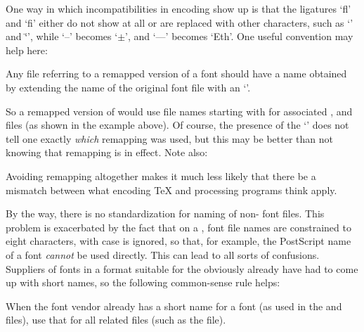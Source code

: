 One way in which incompatibilities in encoding show up is that the
ligatures `fl' and `fi' either do not show at all or are replaced with
other characters, such as `{\registered}' and `\={ }',  %
while `--' becomes `$\pm$', and `---' becomes `Eth'.
One useful convention may help here:

\beginbullets

\bpar Any file referring to a remapped version of a font should have a name
obtained by extending the name of the original font file with an `'.

\endbullets

\noindent
So a remapped version of  would use file names starting with
 for associated {\TFM}, {\PFB} and {\PFM} files
(as shown in the example above).
Of course, the presence of the `' does not tell one exactly 
{\it which\/} remapping was used, but this may be better than not knowing 
that remapping is in effect.
Note also:

\beginbullets

\bpar Avoiding remapping altogether makes it much less likely that there
be a mismatch between what encoding {\TeX} and 
{\DVI} processing programs think apply.

\endbullets
	
\noindent
By the way, there is no standardization for naming of non-{\CM} font files.
This problem is exacerbated %
by the fact that  on a {\PC}, font file names are constrained to eight
characters, with case is ignored, so that, for example, the PostScript
name of a font {\it cannot\/} be used directly.
This can lead to all sorts of confusions.  
Suppliers of fonts in a format suitable for the {\PC} obviously already
have had to come up with short names,
so the following common-sense rule helps:

\beginbullets

\bpar When the font vendor already has a short name for a font
(as used in the {\PFB} and {\PFM} files), 
use that for all related files (such as the {\TFM} file).

\endbullets



